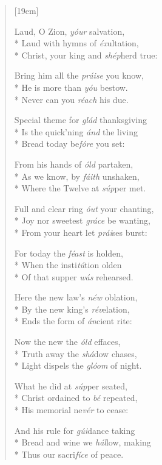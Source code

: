 \documentclass[12pt]{memoir}
\begin{document}
\begin{multicols}{2}
\begin{verse}[19em]

Laud, O Zion, \textit{y\'{o}ur} salvation, \\*
Laud with hymns of \textit{\'{e}x}ultation, \\*
Christ, your king and \textit{sh\'{e}p}herd true:

Bring him all the \textit{pr\'{a}ise} you know, \\*
He is more than \textit{y\'{o}u} bestow. \\*
Never can you \textit{r\'{e}ach} his due.

Special theme for \textit{gl\'{a}d} thanksgiving \\*
Is the quick'ning \textit{\'{a}nd} the living \\*
Bread today be\textit{f\'{o}re} you set:

From his hands of \textit{\'{o}ld} partaken, \\*
As we know, by \textit{f\'{a}ith} unshaken, \\*
Where the Twelve at \textit{s\'{u}p}per met.

Full and clear ring \textit{\'{o}ut} your chanting, \\*
Joy nor sweetest \textit{gr\'{a}ce} be wanting, \\*
From your heart let \textit{pr\'{a}i}ses burst:

For today the \textit{f\'{e}ast} is holden, \\*
When the insti\textit{t\'{u}}tion olden \\*
Of that supper \textit{w\'{a}s} rehearsed.

Here the new law's \textit{n\'{e}w} oblation, \\*
By the new king's \textit{r\'{e}v}elation, \\*
Ends the form of \textit{\'{a}n}cient rite:

Now the new the \textit{\'{ol}d} effaces, \\*
Truth away the \textit{sh\'{a}}dow chases, \\*
Light dispels the \textit{gl\'{o}om} of night.

What he did at \textit{s\'{u}p}per seated, \\*
Christ ordained to \textit{b\'{e}} repeated, \\*
His memorial ne\textit{v\'{e}r} to cease:

And his rule for \textit{g\'{u}i}dance taking \\*
Bread and wine we \textit{h\'{a}l}low, making \\*
Thus our sacri\textit{f\'{i}ce} of peace.


\end{verse}
\end{multicols}
\end{document}
